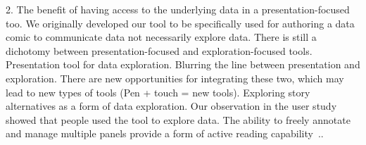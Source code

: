 2. The benefit of having access to the underlying data in a presentation-focused too. We originally developed our tool to be specifically used for authoring a data comic to communicate data not necessarily explore data. There is still a dichotomy between presentation-focused and exploration-focused tools. Presentation tool for data exploration. Blurring the line between presentation and exploration. There are new opportunities for integrating these two, which may lead to new types of tools (Pen + touch = new tools). Exploring story alternatives as a form of data exploration. Our observation in the user study showed that people used the tool to explore data. The ability to freely annotate and manage multiple panels provide a form of active reading capability~\cite{walny2018active}..










